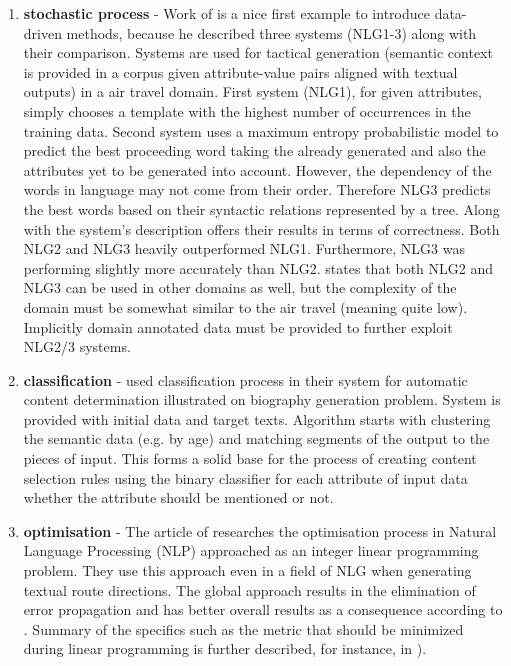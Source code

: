 \begin{enumerate}
	\item \textbf{stochastic process} - Work of \cite{ratnaparkhi2000trainable} is a nice first example to introduce data-driven methods, because he described three systems (NLG1-3) along with their comparison. Systems are used for tactical generation (semantic context is provided in a corpus given attribute-value pairs aligned with textual outputs) in a air travel domain. First system (NLG1), for given attributes, simply chooses a template with the highest number of occurrences in the training data. Second system uses a maximum entropy probabilistic model to predict the best proceeding  word taking the already generated and also the attributes yet to be generated into account. However, the dependency of the words in language may not come from their order. Therefore NLG3 predicts the best words based on their syntactic relations represented by a tree. Along with the system's description \cite{ratnaparkhi2000trainable} offers their results in terms of correctness. Both NLG2 and NLG3 heavily outperformed NLG1. Furthermore, NLG3 was performing slightly more accurately than NLG2.  \cite{ratnaparkhi2000trainable} states that both NLG2 and NLG3 can be used in other domains as well, but the complexity of the domain must be somewhat similar to the air travel (meaning quite low). Implicitly domain annotated data must be provided to further exploit NLG2/3 systems.\label{dd-1}
	\item \textbf{classification} - \cite{duboue2003statistical} used classification process in their system for automatic content determination illustrated on biography generation problem. System is provided with initial data and target texts. Algorithm starts with clustering the semantic data (e.g. by age) and matching segments of the output to the pieces of input. This forms a solid base for the process of creating content selection rules using the binary classifier for each attribute of input data whether the attribute should be mentioned or not.\label{dd-2}
	\item \textbf{optimisation} - The article of \cite{marciniak2005beyond} researches the optimisation process in Natural Language Processing (NLP) approached as an integer linear programming problem. They use this approach even in a field of NLG when generating textual route directions. The global approach results in the elimination of error propagation and has better overall results as a consequence according to \cite{marciniak2005beyond}. Summary of the specifics such as the metric that should be minimized during linear programming is further described, for instance, in \cite{gatt2018survey}).\label{dd-3}

\end{enumerate}
